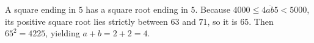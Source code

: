 A square ending in $5$ has a square root ending in $5$. Because $4000\le\overline{4ab5}<5000$, its positive square root lies strictly between $63$ and $71$, so it is $65$. Then $65^2=4225$, yielding $a+b=2+2=\boxed4$.
